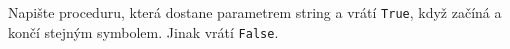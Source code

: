 \question[30]
Napište proceduru, která dostane parametrem string a vrátí \texttt{True}, když
začíná a končí stejným symbolem. Jinak vrátí \texttt{False}.